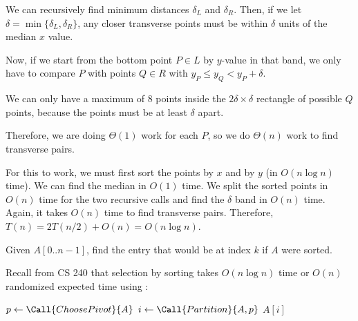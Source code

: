 We can recursively find minimum distances $\delta_L$ and $\delta_R$.
Then, if we let $\delta = \min\{\delta_L,\delta_R\}$,
any closer transverse points must be within $\delta$ units of the median $x$ value.

Now, if we start from the bottom point $P \in L$ by $y$-value in that band,
we only have to compare $P$ with points $Q \in R$ with $y_P \leq y_Q < y_P + \delta$.

We can only have a maximum of 8 points inside the $2\delta \times \delta$
rectangle of possible $Q$ points, because the points must be at least $\delta$ apart.

Therefore, we are doing $\Theta(1)$ work for each $P$, so we do $\Theta(n)$
work to find transverse pairs.

For this to work, we must first sort the points by $x$ and by $y$ (in $O(n\log n)$ time).
We can find the median in $O(1)$ time.
We split the sorted points in $O(n)$ time for the two recursive calls
and find the $\delta$ band in $O(n)$ time.
Again, it takes $O(n)$ time to find transverse pairs.
Therefore, $T(n) = 2T(n/2) + O(n) = O(n\log n)$.

\begin{problem}[selection]
Given $A[0..n-1]$, find the entry that would be at index $k$ if $A$ were sorted.
\end{problem}

Recall from CS 240 that selection by sorting takes $O(n\log n)$ time
or $O(n)$ randomized expected time using :

\begin{algorithm}[H]
  \caption{}
  \begin{algorithmic}[1]
    \State $p \gets \Call{ChoosePivot}{A}$
    \State $i \gets \Call{Partition}{A, p}$ 
     \Return $A[i]$
     \Return {}
    \Else{} \Return {}
    \EndIf
  \end{algorithmic}
\end{algorithm}

